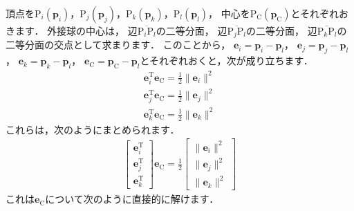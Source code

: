 ﻿\documentclass[a4paper]{jsarticle}
\begin{document}
頂点を$\mathrm{P}_{i}(\boldsymbol{p}_{i})$，$\mathrm{P}_{j}(\boldsymbol{p}_{j})$，$\mathrm{P}_{k}(\boldsymbol{p}_{k})$，$\mathrm{P}_{l}(\boldsymbol{p}_{l})$，
中心を$\mathrm{P}_{\mathrm{C}}(\boldsymbol{p}_{\mathrm{C}})$とそれぞれおきます．
外接球の中心は，
辺$\overline{\mathrm{P}_{i}\mathrm{P}_{l}}$の二等分面，
辺$\overline{\mathrm{P}_{j}\mathrm{P}_{l}}$の二等分面，
辺$\overline{\mathrm{P}_{k}\mathrm{P}_{l}}$の二等分面の交点として求まります．
このことから，
$\boldsymbol{e}_{i}=\boldsymbol{p}_{i}-\boldsymbol{p}_{l}$，
$\boldsymbol{e}_{j}=\boldsymbol{p}_{j}-\boldsymbol{p}_{l}$，
$\boldsymbol{e}_{k}=\boldsymbol{p}_{k}-\boldsymbol{p}_{l}$，
$\boldsymbol{e}_{\mathrm{C}}=\boldsymbol{p}_{\mathrm{C}}-\boldsymbol{p}_{l}$とそれぞれおくと，次が成り立ちます．
\begin{align*}
\boldsymbol{e}_{i}^{\mathrm{T}}\boldsymbol{e}_{\mathrm{C}}=\frac{1}{2}\|\boldsymbol{e}_{i}\|^{2}
\\
\boldsymbol{e}_{j}^{\mathrm{T}}\boldsymbol{e}_{\mathrm{C}}=\frac{1}{2}\|\boldsymbol{e}_{j}\|^{2}
\\
\boldsymbol{e}_{k}^{\mathrm{T}}\boldsymbol{e}_{\mathrm{C}}=\frac{1}{2}\|\boldsymbol{e}_{k}\|^{2}
\end{align*}
これらは，次のようにまとめられます．
\begin{align*}
\begin{bmatrix} \boldsymbol{e}_{i}^{\mathrm{T}} \\ \boldsymbol{e}_{j}^{\mathrm{T}} \\ \boldsymbol{e}_{k}^{\mathrm{T}} \end{bmatrix}
\boldsymbol{e}_{\mathrm{C}}=
\frac{1}{2}
\begin{bmatrix} \|\boldsymbol{e}_{i}\|^{2} \\ \|\boldsymbol{e}_{j}\|^{2} \\ \|\boldsymbol{e}_{k}\|^{2} \end{bmatrix}
\end{align*}
これは$\boldsymbol{e}_{\mathrm{C}}$について次のように直接的に解けます．
\end{document}
